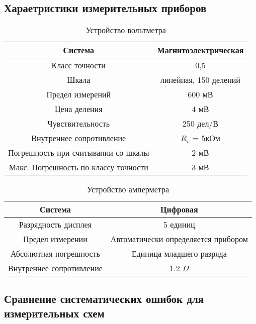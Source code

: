 \documentclass[12pt]{article}
\begin{document}
\begin{thebibliography}
\subsection*{Хараетристики измерительных приборов}
\label{sec: characteristics}
\begin{table}[H]
\centering
\caption{Устройство вольтметра}
\begin{tabular}{|c|c|}
\hline
Система                              & Магнитоэлектрическая \\\hline
Класс точности                       & 0,5                   \\\hline
Шкала                                & линейная, 150 делений \\\hline
Предел измерений                     & 600 мВ                \\\hline
Цена деления                         & 4 мВ                  \\\hline
Чувствительность                     & 250 дел/В             \\\hline
Внутреннее сопротивление             & $R_v$ = 5кОм           \\\hline
Погрешность при считывании со шкалы  & 2 мВ                  \\\hline
Макс. Погрешность по классу точности & 3 мВ                 \\\hline
\end{tabular}
\end{table}
\begin{table}[H]
\caption{Устройство амперметра}
\centering
\begin{tabular}{|c|c|}
\hline
Система                              & Цифровая\\\hline
Разрядность дисплея                  & 5 единиц\\\hline
Предел измерении                     &  Автоматически определяется прибором\\\hline
Абсолютная погрешность               &  Единица младшего разряда\\\hline
Внутреннее сопротивление             &  $1.2$ $\Omega$\\\hline
\end{tabular}    
\end{table}

\subsection*{Сравнение систематических ошибок для измерительных схем}
\label{sec: comparison}
\begin{figure}[H]%
\centering
    \begin{subfigure}{0.4\textwidth}
    

\end{subfigure}
\end{figure}
\end{thebibliography}
\end{document}
